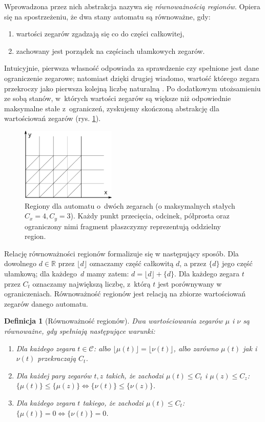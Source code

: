 \documentclass{pracamgr}
\newcommand{\floor}[1]{\lfloor #1 \rfloor}
\newcommand{\br}[1]{\{ #1 \}}
\theoremstyle{plain}
\newtheorem{definition}{Definicja}
\begin{document}
Wprowadzona przez nich abstrakcja nazywa się \emph{równoważnością
  regionów}. Opiera się na spostrzeżeniu, że dwa stany automatu są
równoważne, gdy:
\begin{samepage}
\begin{enumerate}
  \item wartości zegarów zgadzają się co do części całkowitej,
  \item zachowany jest porządek na częściach ułamkowych zegarów.
\end{enumerate}
\end{samepage}
Intuicyjnie, pierwsza własność odpowiada za sprawdzenie czy spełnione
jest dane ograniczenie zegarowe; natomiast dzięki drugiej wiadomo,
wartość którego zegara przekroczy jako pierwsza kolejną liczbę
naturalną \cite{am:decision}. Po dodatkowym utożsamieniu ze sobą
stanów, w~których wartości zegarów są większe niż odpowiednie
maksymalne stałe z~ograniczeń, zyskujemy skończoną abstrakcję dla
wartościowań zegarów (rys. \ref{img:regions}).
\begin{figure}
  \centering
  \includegraphics[width=0.4\textwidth]{img/ta-regions}
  \caption{Regiony dla automatu o~dwóch zegarach (o maksymalnych
    stałych $C_x = 4, C_y = 3$). Każdy punkt przecięcia, odcinek, półprosta oraz
    ograniczony nimi fragment płaszczyzny reprezentują oddzielny
    region. }
  \label{img:regions}
\end{figure}

Relację równoważności regionów formalizuje się w następujący sposób.
Dla dowolnego $d\in\mathbb{R}$ przez $\floor{d}$ oznaczamy część
całkowitą $d$, a przez $\br{d}$ jego część ułamkową; dla każdego~$d$
mamy zatem: $d = \floor{d} + \br{d}$. Dla każdego zegara $t$ przez
$C_t$ oznaczamy największą liczbę, z~którą $t$ jest porównywany w
ograniczeniach. Równoważność regionów jest relacją na zbiorze
wartościowań zegarów danego automatu.
\begin{definition}[Równoważność regionów]
  Dwa wartościowania zegarów $\mu$ i $\nu$ są równoważne, gdy
  spełniają następujące warunki:
  \begin{enumerate}
    \item Dla każdego zegara $t\in\mathcal{C}$: albo $\floor{\mu(t)} =
    \floor{\nu(t)}$, albo zarówno $\mu(t)$ jak i $\nu(t)$ przekraczają $C_t$.
    \item Dla każdej pary zegarów $t, z$ takich, że zachodzi $\mu(t)
    \leq C_t$ i $\mu(z) \leq C_z$:\\ \mbox{$\br{\mu(t)} \leq
      \br{\mu(z)} \iff \br{\nu(t)} \leq \br{\nu(z)}$}.
    \item Dla każdego zegara $t$ takiego, że zachodzi $\mu(t) \leq
    C_t$: $\br{\mu(t)}=0 \iff \br{\nu(t)}=0$.
  \end{enumerate}

\end{definition}
\end{document}

